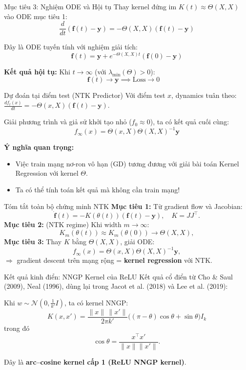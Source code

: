 \begin{frame}{Mục tiêu 3: Nghiệm ODE và Hội tụ}
  Thay kernel đứng im $K(t) \approx \Theta(X,X)$ vào ODE mục tiêu 1:
  \[ \frac{d}{dt}(\mathbf{f}(t) - \mathbf{y}) = -\Theta(X,X)(\mathbf{f}(t) - \mathbf{y}) \]
  
  Đây là ODE tuyến tính với nghiệm giải tích:
  \[ \mathbf{f}(t) = \mathbf{y} + e^{-\Theta(X,X)t}(\mathbf{f}(0) - \mathbf{y}) \]
  
  \textbf{Kết quả hội tụ:} Khi $t \to \infty$ (với $\lambda_{\min}(\Theta) > 0$):
  \[ \mathbf{f}(t) \to \mathbf{y} \implies \text{Loss} \to 0 \quad \]
\end{frame}

\begin{frame}{Dự đoán tại điểm test (NTK Predictor)}
  Với điểm test $x$, dynamics tuân theo: $\frac{df_t(x)}{dt} = -\Theta(x,X)(\mathbf f(t) - \mathbf y)$.
  
  Giải phương trình và giả sử khởi tạo nhỏ ($f_0 \approx 0$), ta có kết quả cuối cùng:
  \[
    \boxed{ f_\infty(x) = \Theta(x,X)\Theta(X,X)^{-1}\mathbf y }
  \]

  \textbf{Ý nghĩa quan trọng:}
  \begin{itemize}
    \item Việc train mạng nơ-ron vô hạn (GD) tương đương với giải bài toán Kernel Regression với kernel $\Theta$.
    \item Ta có thể tính toán kết quả mà không cần train mạng!
  \end{itemize}
\end{frame}

\begin{frame}{Tóm tắt toàn bộ chứng minh NTK}
     \textbf{Mục tiêu 1:}  
          Từ gradient flow và Jacobian:
          \[
            \dot{\mathbf f}(t)
            = -K(\theta(t))(\mathbf f(t)-\mathbf y),
            \quad K = JJ^\top.
          \]
     \textbf{Mục tiêu 2:} (NTK regime)  
          Khi width $m\to\infty$:
          \[
            K_m(\theta(t)) \approx K_m(\theta(0)) \to \Theta(X,X),
          \]
     \textbf{Mục tiêu 3:}  
          Thay $K$ bằng $\Theta(X,X)$, giải ODE:
          \[
            f_\infty(x)
            = \Theta(x,X)\Theta(X,X)^{-1}\mathbf y,
          \]
          $\Rightarrow$ gradient descent trên mạng rộng = \textbf{kernel regression} với NTK.
\end{frame}

\begin{frame}{Kết quả kinh điển: NNGP Kernel của ReLU}
Kết quả cổ điển từ Cho \& Saul (2009), Neal (1996), dùng lại trong
Jacot et al. (2018) và Lee et al. (2019):

\vspace{0.2cm}
Khi $w \sim \mathcal N(0,\tfrac{1}{k'}I)$, ta có kernel NNGP:
\[
K(x,x')
=
\frac{\|x\|\,\|x'\|}{2\pi k'}
\Big(
(\pi - \theta)\cos\theta + \sin\theta
\Big)
I_k
\]
trong đó
\[
\cos\theta
=
\frac{x^\top x'}{\|x\|\|x'\|}.
\]

\vspace{0.2cm}
Đây là \textbf{arc--cosine kernel cấp 1 (ReLU NNGP kernel)}.
\end{frame}

